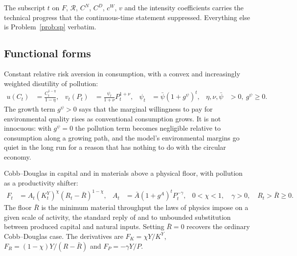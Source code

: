 The subscript $t$ on $F$, $\mathcal R$, $C^N$, $C^D$, $c^W$, $v$ and the intensity coefficients carries
the technical progress that the continuous-time statement suppressed. Everything else is
Problem~\ref{prob:sp} verbatim.

\subsection{Functional forms}\label{sec:qsp:setup:forms}

 Constant relative risk aversion in consumption, with a convex and
increasingly weighted disutility of pollution:
\begin{align}
u\!\left(C_t\right) &= \frac{C_t^{1-\eta}}{1-\eta},
&
v_t\!\left(P_t\right) &= \frac{\psi_t}{1+\nu}P_t^{1+\nu},
&
\psi_t &= \bar\psi\left(1+g^{\psi}\right)^t,
&
\eta,\nu,\bar\psi &>0,\ g^\psi\ge0 .
\label{eq:qsp:preferences}
\end{align}
The growth term $g^\psi>0$ says that the marginal willingness to pay for environmental quality rises
as conventional consumption grows. It is not innocuous: with $g^\psi=0$ the pollution term becomes
negligible relative to consumption along a growing path, and the model's environmental margins go
quiet in the long run for a reason that has nothing to do with the circular economy.

 Cobb--Douglas in capital and in materials above a physical floor, with
pollution as a productivity shifter:
\begin{align}
F_t &= A_t\left(K^Y_t\right)^{\chi}\left(R_t-\bar R\right)^{1-\chi},
&
A_t &= \bar A\left(1+g^A\right)^tP_t^{-\gamma},
&
0<\chi<1,\quad \gamma>0,\quad R_t>\bar R\ge0 .
\label{eq:qsp:production}
\end{align}
The floor $\bar R$ is the minimum material throughput the laws of physics impose on a given scale of
activity, the standard reply of \textcite{daly1977} and \textcite{stern1997} to unbounded
substitution between produced capital and natural inputs. Setting $\bar R=0$ recovers the ordinary
Cobb--Douglas case. The derivatives are $F_K=\chi Y/K^Y$, $F_R=\left(1-\chi\right)Y/\left(R-\bar R\right)$
and $F_P=-\gamma Y/P$.

